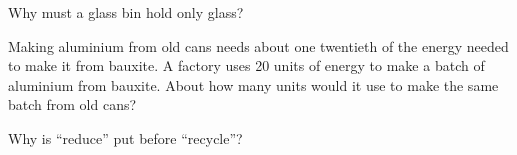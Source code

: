 \begin{exercise}[$\star$]\label{exo:g5:raw-materials-and-recycling:9}
Why must a glass bin hold only glass?
\end{exercise}

\begin{exercise}[$\star\star$]\label{exo:g5:raw-materials-and-recycling:10}
Making aluminium from old cans needs about one twentieth of the energy
needed to make it from bauxite. A factory uses 20 units of energy to make
a batch of aluminium from bauxite. About how many units would it use to
make the same batch from old cans?
\end{exercise}

\begin{exercise}[$\star\star$]\label{exo:g5:raw-materials-and-recycling:11}
Why is ``reduce'' put before ``recycle''?
\end{exercise}
